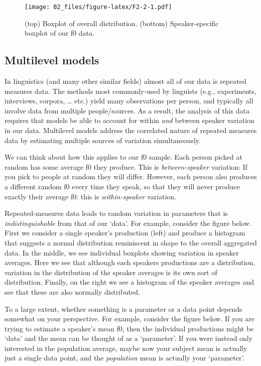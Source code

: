 \documentclass[
]{book}
\begin{document}
\begin{figure}
\centering
\texttt{[image: 02\_files/figure-latex/F2-2-1.pdf]}
\caption{\label{fig:F2-2}(top) Boxplot of overall distribution. (bottom) Speaker-specific boxplot of our f0 data.}
\end{figure}

\hypertarget{multilevel-models}{%
\subsection{Multilevel models}\label{multilevel-models}}

In linguistics (and many other similar fields) almost all of our data is repeated measures data. The methods most commonly-used by linguists (e.g., experiments, interviews, corpora, \ldots{} etc.) yield many observations per person, and typically all involve data from multiple people/sources. As a result, the analysis of this data requires that models be able to account for within \emph{and} between speaker variation in our data. Multilevel models address the correlated nature of repeated measures data by estimating multiple sources of variation simultaneously.

We can think about how this applies to our f0 sample. Each person picked at random has some average f0 they produce. This is \emph{between-speaker} variation: If you pick to people at random they will differ. However, each person also produces a different random f0 every time they speak, so that they will never produce exactly their average f0: this is \emph{within-speaker} variation.

Repeated-measures data leads to random variation in parameters that is \emph{indistinguishable} from that of our `data'. For example, consider the figure below. First we consider a single speaker's production (left) and produce a histogram that suggests a normal distribution reminiscent in shape to the overall aggregated data. In the middle, we see individual boxplots showing variation in speaker averages. Here we see that although each speakers productions are a distribution, variation in the distribution of the speaker averages is its own sort of distribution. Finally, on the right we see a histogram of the speaker averages and see that these are also normally distributed.

To a large extent, whether something is a parameter or a data point depends somewhat on your perspective. For example, consider the figure below. If you are trying to estimate a speaker's mean f0, then the individual productions might be `data' and the mean can be thought of as a `parameter'. If you were instead only interested in the population average, maybe now your subject mean is actually just a single data point, and the \emph{population} mean is actually your `parameter'.
\end{document}
